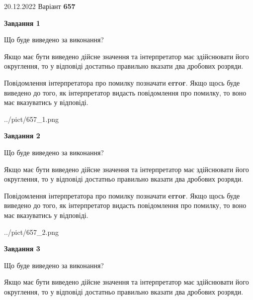\documentclass[12pt, ukrainian]{article}
\begin{document}
{20.12.2022 Варіант \No \textbf { 657 }\par}
{
\begin {Large}

{\begin {center}\textbf{Завдання 1}\end {center}}\par
Що буде виведено за виконання? \par

Якщо має бути виведено дійсне значення та інтерпретатор має здійснювати його округлення, 
то у відповіді достатньо правильно вказати два дробових розряди.

Повідомлення інтерпретатора про помилку позначати \textbf{error}.
Якщо щось буде виведено до того, як інтерпретатор видасть повідомлення про помилку, 
то воно має вказуватись у відповіді. \par

\begin{center}
	{../pict/657_1.png}
\end{center}
\newpage

{\begin {center}\textbf{Завдання 2}\end {center}}\par
Що буде виведено за виконання? \par

Якщо має бути виведено дійсне значення та інтерпретатор має здійснювати його округлення, 
то у відповіді достатньо правильно вказати два дробових розряди.

Повідомлення інтерпретатора про помилку позначати \textbf{error}.
Якщо щось буде виведено до того, як інтерпретатор видасть повідомлення про помилку, 
то воно має вказуватись у відповіді. \par

\begin{center}
	{../pict/657_2.png}
\end{center}
\newpage

{\begin {center}\textbf{Завдання 3}\end {center}}\par
Що буде виведено за виконання? \par

Якщо має бути виведено дійсне значення та інтерпретатор має здійснювати його округлення, 
то у відповіді достатньо правильно вказати два дробових розряди.


\end{Large}}
\end{document}
